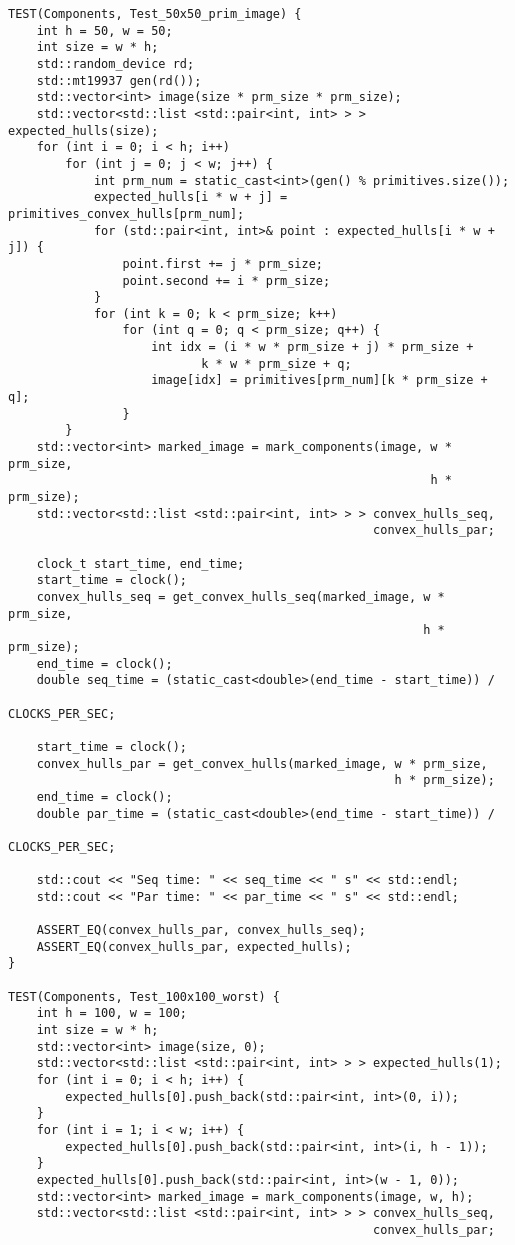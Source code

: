 \documentclass{report}
\begin{document}
\begin{lstlisting}
TEST(Components, Test_50x50_prim_image) {
    int h = 50, w = 50;
    int size = w * h;
    std::random_device rd;
    std::mt19937 gen(rd());
    std::vector<int> image(size * prm_size * prm_size);
    std::vector<std::list <std::pair<int, int> > > expected_hulls(size);
    for (int i = 0; i < h; i++)
        for (int j = 0; j < w; j++) {
            int prm_num = static_cast<int>(gen() % primitives.size());
            expected_hulls[i * w + j] = primitives_convex_hulls[prm_num];
            for (std::pair<int, int>& point : expected_hulls[i * w + j]) {
                point.first += j * prm_size;
                point.second += i * prm_size;
            }
            for (int k = 0; k < prm_size; k++)
                for (int q = 0; q < prm_size; q++) {
                    int idx = (i * w * prm_size + j) * prm_size +
                           k * w * prm_size + q;
                    image[idx] = primitives[prm_num][k * prm_size + q];
                }
        }
    std::vector<int> marked_image = mark_components(image, w * prm_size,
                                                           h * prm_size);
    std::vector<std::list <std::pair<int, int> > > convex_hulls_seq,
                                                   convex_hulls_par;

    clock_t start_time, end_time;
    start_time = clock();
    convex_hulls_seq = get_convex_hulls_seq(marked_image, w * prm_size,
                                                          h * prm_size);
    end_time = clock();
    double seq_time = (static_cast<double>(end_time - start_time)) /
                                                                CLOCKS_PER_SEC;

    start_time = clock();
    convex_hulls_par = get_convex_hulls(marked_image, w * prm_size,
                                                      h * prm_size);
    end_time = clock();
    double par_time = (static_cast<double>(end_time - start_time)) /
                                                                CLOCKS_PER_SEC;

    std::cout << "Seq time: " << seq_time << " s" << std::endl;
    std::cout << "Par time: " << par_time << " s" << std::endl;

    ASSERT_EQ(convex_hulls_par, convex_hulls_seq);
    ASSERT_EQ(convex_hulls_par, expected_hulls);
}

TEST(Components, Test_100x100_worst) {
    int h = 100, w = 100;
    int size = w * h;
    std::vector<int> image(size, 0);
    std::vector<std::list <std::pair<int, int> > > expected_hulls(1);
    for (int i = 0; i < h; i++) {
        expected_hulls[0].push_back(std::pair<int, int>(0, i));
    }
    for (int i = 1; i < w; i++) {
        expected_hulls[0].push_back(std::pair<int, int>(i, h - 1));
    }
    expected_hulls[0].push_back(std::pair<int, int>(w - 1, 0));
    std::vector<int> marked_image = mark_components(image, w, h);
    std::vector<std::list <std::pair<int, int> > > convex_hulls_seq,
                                                   convex_hulls_par;


\end{lstlisting}
\end{document}
